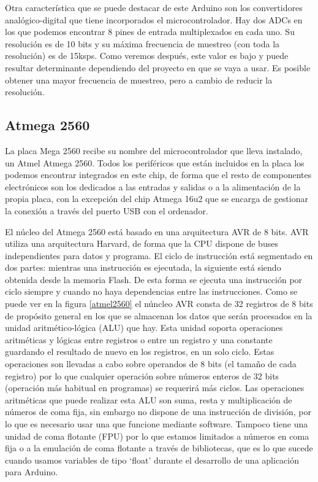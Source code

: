 Otra característica que se puede destacar de este Arduino son los convertidores analógico-digital que tiene incorporados el microcontrolador. Hay dos ADCs en los que podemos encontrar 8 pines de entrada multiplexados en cada uno. Su resolución es de 10 bits y su máxima frecuencia de muestreo (con toda la resolución) es de 15ksps. Como veremos después, este valor es bajo y puede resultar determinante dependiendo del proyecto en que se vaya a usar. Es posible obtener una mayor frecuencia de muestreo, pero a cambio de reducir la resolución.

\subsection*{Atmega 2560}
La placa Mega 2560 recibe su nombre del microcontrolador que lleva instalado, un Atmel Atmega 2560. Todos los periféricos que están incluidos en la placa los podemos encontrar integrados en este chip, de forma que el resto de componentes electrónicos son los dedicados a las entradas y salidas o a la alimentación de la propia placa, con la excepción del chip Atmega 16u2 que se encarga de gestionar la conexión a través del puerto USB con el ordenador.

El núcleo del Atmega 2560 está basado en una arquitectura AVR de 8 bits. AVR utiliza una arquitectura Harvard, de forma que la CPU dispone de buses independientes para datos y programa. El ciclo de instrucción está segmentado en dos partes: mientras una instrucción es ejecutada, la siguiente está siendo obtenida desde la memoria Flash. De esta forma se ejecuta una instrucción por ciclo siempre y cuando no haya dependencias entre las instrucciones.
Como se puede ver en la figura \ref{atmel2560} el núncleo AVR consta de 32 registros de 8 bits de propósito general en los que se almacenan los datos que serán procesados en la unidad aritmético-lógica (ALU) que hay. Esta unidad soporta operaciones aritméticas y lógicas entre registros o entre un registro y una constante guardando el resultado de nuevo en los registros, en un solo ciclo. Estas operaciones son llevadas a cabo sobre operandos de 8 bits (el tamaño de cada registro) por lo que cualquier operación sobre números enteros de 32 bits (operación más habitual en programas) se requerirá más ciclos. Las operaciones aritméticas que puede realizar esta ALU son suma, resta y multiplicación de números de coma fija, sin embargo no dispone de una instrucción de división, por lo que es necesario usar una que funcione mediante software. Tampoco tiene una unidad de coma flotante (FPU) por lo que estamos limitados a números en coma fija o a la emulación de coma flotante a través de bibliotecas, que es lo que sucede cuando usamos variables de tipo `float' durante el desarrollo de una aplicación para Arduino.

